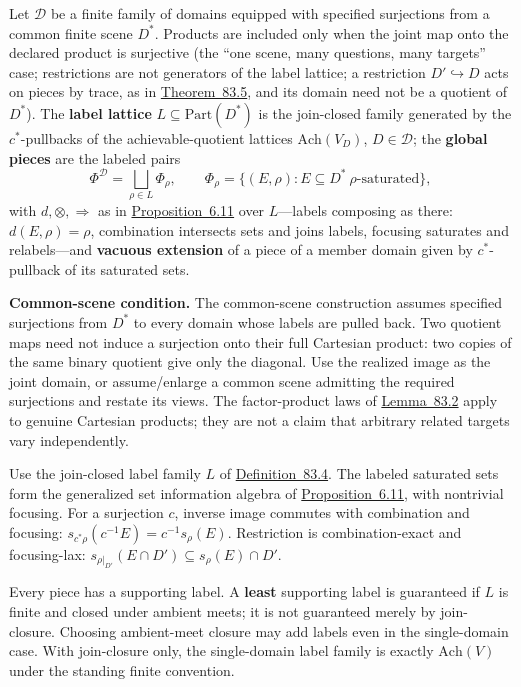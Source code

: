 \begin{thmdef}

Let \(\mathcal D\) be a finite family of domains equipped with specified surjections from a common finite scene \(D^*\). Products are included only when the joint map onto the declared product is surjective (the ``one scene, many questions, many targets'' case; restrictions are not generators of the label lattice; a restriction \(D' \hookrightarrow D\) acts on pieces by trace, as in \hyperlink{stmt:83.5}{Theorem~83.5}, and its domain need not be a quotient of \(D^*\)). The \textbf{label lattice} \(L \subseteq \mathrm{Part}(D^*)\) is the join-closed family generated by the \(c^*\)-pullbacks of the achievable-quotient lattices \(\mathrm{Ach}(V_D)\), \(D \in \mathcal{D}\); the \textbf{global pieces} are the labeled pairs
\[
\Phi^{\mathcal{D}} = \bigsqcup_{\rho \in L} \Phi_\rho, \qquad \Phi_\rho = \{(E, \rho) : E \subseteq D^* \ \rho\text{-saturated}\},
\]
with \(d, \otimes, \Rightarrow\) as in \hyperlink{stmt:6.11}{Proposition~6.11} over \(L\)---\hspace{0pt}labels composing as there: \(d(E,\rho) = \rho\), combination intersects sets and joins labels, focusing saturates and relabels---\hspace{0pt}and \textbf{vacuous extension} of a piece of a member domain given by \(c^*\)-pullback of its saturated sets.
\end{thmdef}

\textbf{Common-scene condition.} The common-scene construction assumes specified surjections from \(D^*\) to every domain whose labels are pulled back. Two quotient maps need not induce a surjection onto their full Cartesian product: two copies of the same binary quotient give only the diagonal. Use the realized image as the joint domain, or assume/enlarge a common scene admitting the required surjections and restate its views. The factor-product laws of \hyperlink{stmt:83.2}{Lemma~83.2} apply to genuine Cartesian products; they are not a claim that arbitrary related targets vary independently.

\begin{thmplain}

Use the join-closed label family \(L\) of \hyperlink{stmt:83.4}{Definition~83.4}. The labeled saturated sets form the generalized set information algebra of \hyperlink{stmt:6.11}{Proposition~6.11}, with nontrivial focusing. For a surjection \(c\), inverse image commutes with combination and focusing: \(s_{c^*\rho}(c^{-1}E)=c^{-1}s_\rho(E)\). Restriction is combination-exact and focusing-lax: \(s_{\rho|_{D'}}(E\cap D')\subseteq s_\rho(E)\cap D'\).

Every piece has a supporting label. A \textbf{least} supporting label is guaranteed if \(L\) is finite and closed under ambient meets; it is not guaranteed merely by join-closure. Choosing ambient-meet closure may add labels even in the single-domain case. With join-closure only, the single-domain label family is exactly \(\mathrm{Ach}(V)\) under the standing finite convention.
\end{thmplain}


